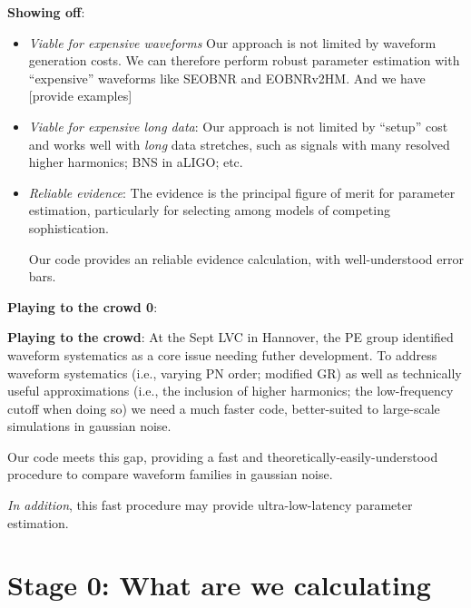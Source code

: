 \documentclass[twocolumn,prd,nofootinbib]{revtex4}
\begin{document}
\noindent \textbf{Showing off}:
\begin{itemize}
\item \emph{Viable for expensive waveforms} Our approach is not limited by waveform generation costs.  We can therefore perform
robust parameter estimation with ``expensive'' waveforms like SEOBNR and EOBNRv2HM.  And we have [provide examples]

\item \emph{Viable for expensive long data}: Our approach is not limited by ``setup'' cost and works well with \emph{long} data
  stretches, such as signals with many resolved higher harmonics; BNS in aLIGO; etc.

\item \emph{Reliable evidence}: The evidence is the principal figure of merit for parameter estimation,
particularly for selecting among models of competing sophistication.   

Our code provides an  reliable evidence calculation, with well-understood error bars.
\end{itemize}

\noindent \textbf{Playing to the crowd 0}: 

\noindent \textbf{Playing to the crowd}: At the Sept LVC in Hannover, the PE group identified waveform systematics as a
core issue needing futher development.  To address waveform systematics (i.e., varying PN order; modified GR) as well as
technically useful approximations (i.e., the inclusion of higher harmonics; the low-frequency cutoff when doing so) we
need a much faster code, better-suited to large-scale simulations in gaussian noise. 

Our code meets this gap, providing a fast and theoretically-easily-understood procedure to compare waveform families in
gaussian noise.  

\emph{In addition}, this fast procedure may provide ultra-low-latency parameter estimation.

\section{Stage 0: What are we calculating}
\end{document}
